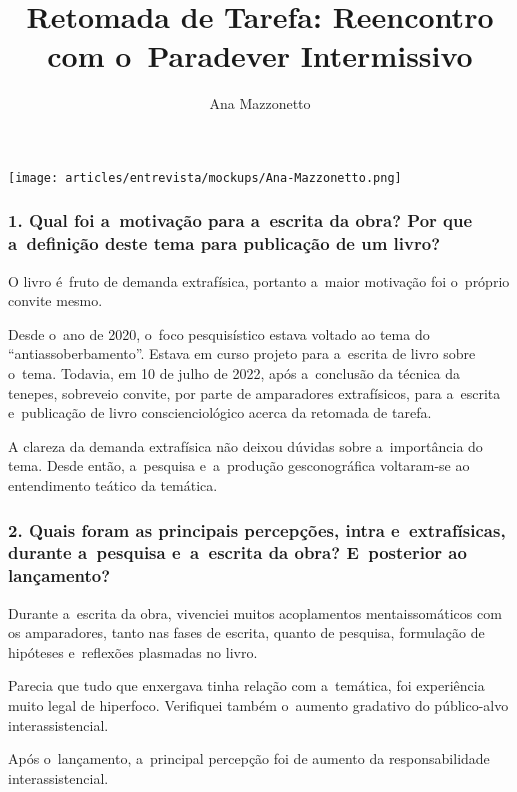 \documentclass{gescons}
\author{Ana Mazzonetto}
\title{Retomada de Tarefa: Reencontro com o~Paradever Intermissivo}
\begin{document}
    \makeentrevistatitle


    \begin{multicols}{2}


\begin{center}

    \texttt{[image: articles/entrevista/mockups/Ana-Mazzonetto.png]}
\end{center}

\subsubsection{1. Qual foi a~motivação para a~escrita da obra? Por que a~definição deste tema para publicação de um livro?}

O livro é~fruto de demanda extrafísica, portanto a~maior motivação foi o~próprio convite mesmo. 

Desde o~ano de 2020, o~foco pesquisístico estava voltado ao tema do “antiassoberbamento”. Estava em curso projeto para a~escrita de livro sobre o~tema. Todavia, em 10 de julho de 2022, após a~conclusão da técnica da tenepes, sobreveio convite, por parte de amparadores extrafísicos, para a~escrita e~publicação de livro conscienciológico acerca da retomada de tarefa. 

A clareza da demanda extrafísica não deixou dúvidas sobre a~importância do tema. Desde então, a~pesquisa e~a~produção gesconográfica voltaram-se ao entendimento teático da temática.

\subsubsection{2. Quais foram as principais percepções, intra e~extrafísicas, durante a~pesquisa e~a~escrita da obra? E~posterior ao lançamento?}

Durante a~escrita da obra, vivenciei muitos acoplamentos mentaissomáticos com os amparadores, tanto nas fases de escrita, quanto de pesquisa, formulação de hipóteses e~reflexões plasmadas no livro. 

Parecia que tudo que enxergava tinha relação com a~temática, foi experiência muito legal de hiperfoco. Verifiquei também o~aumento gradativo do público-alvo interassistencial.

Após o~lançamento, a~principal percepção foi de aumento da responsabilidade interassistencial. 


\end{multicols}
\end{document}
